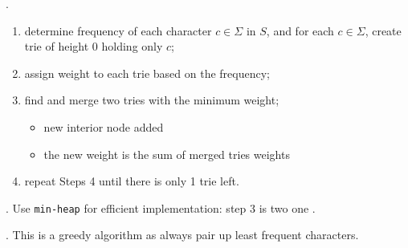 \documentclass{article}
\begin{document}
\begin{algo}[].
    \begin{enumerate}
        \item determine frequency of each character $c \in \Sigma$ in $S$, and for each $c \in \Sigma$, create trie of height 0 holding only $c$; 
        \item assign weight to each trie based on the frequency;  
        \item find and merge two tries with the minimum weight; 
        \begin{itemize}
            \item new interior node added
            \item the new weight is the sum of merged tries weights
        \end{itemize}
        \item repeat Steps 4 until there is only 1 trie left. 
    \end{enumerate}
\end{algo}

\begin{comm}[].
    Use \texttt{min-heap} for efficient implementation: step 3 is two  one . 
\end{comm}

\begin{discovery}[].
    This is a greedy algorithm as always pair up least frequent characters. 
\end{discovery}
\end{document}
